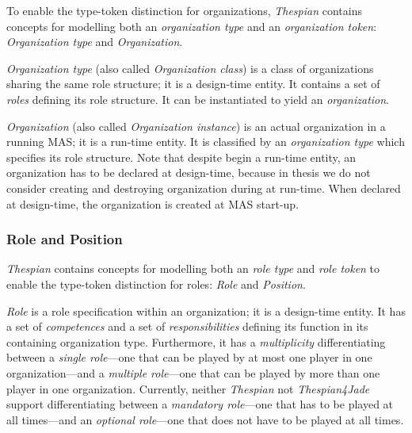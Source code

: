 To enable the type-token distinction for organizations, \textit{Thespian} contains concepts for modelling both an \textit{organization type} and an \textit{organization token}: \textit{Organization type} and \textit{Organization}.

\textit{Organization type} (also called \textit{Organization class}) is a class of organizations sharing the same role structure; it is a design-time entity.
It contains a set of \textit{roles} defining its role structure.
It can be instantiated to yield an \textit{organization}.

\textit{Organization} (also called \textit{Organization instance}) is an actual organization in a running MAS; it is a run-time entity.
It is classified by an \textit{organization type} which specifies its role structure.
Note that despite begin a run-time entity, an organization has to be declared at design-time, because in thesis we do not consider creating and destroying organization during at run-time.
When declared at design-time, the organization is created at MAS start-up.

\subsubsection*{Role and Position}

\textit{Thespian} contains concepts for modelling both an \textit{role type} and \textit{role token} to enable the type-token distinction for roles: \textit{Role} and \textit{Position}.

\textit{Role} is a role specification within an organization; it is a design-time entity.
It has a set of \textit{competences} and a set of \textit{responsibilities} defining its function in its containing organization type.
Furthermore, it has a \textit{multiplicity} differentiating between a \textit{single role}---one that can be played by at most one player in one organization---and a \textit{multiple role}---one that can be played by more than one player in one organization.
Currently, neither \textit{Thespian} not \textit{Thespian4Jade} support differentiating between a \textit{mandatory role}---one that has to be played at all times---and an \textit{optional role}---one that does not have to be played at all times.

